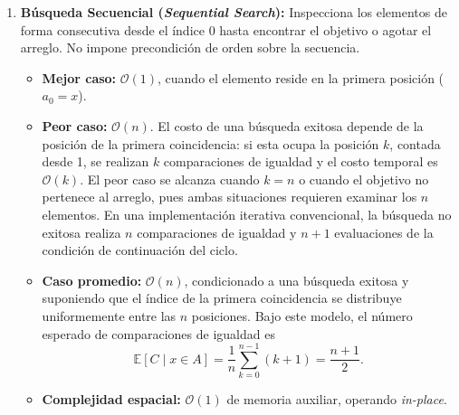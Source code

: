 \documentclass[11pt,letterpaper]{article}
\begin{document}
\begin{enumerate}
    \item \textbf{Búsqueda Secuencial (\textit{Sequential Search}):} 
    Inspecciona los elementos de forma consecutiva desde el índice $0$ hasta encontrar el objetivo o agotar el arreglo. No impone precondición de orden sobre la secuencia.
    \begin{itemize}
        \item \textbf{Mejor caso:} $\mathcal{O}(1)$, cuando el elemento reside en la primera posición ($a_0 = x$).
        \item \textbf{Peor caso:} $\mathcal{O}(n)$. El costo de una búsqueda exitosa
        depende de la posición de la primera coincidencia: si esta ocupa
        la posición $k$, contada desde 1, se realizan $k$ comparaciones
        de igualdad y el costo temporal es $\mathcal{O}(k)$. El peor caso se alcanza
        cuando $k=n$ o cuando el objetivo no pertenece al arreglo, pues
        ambas situaciones requieren examinar los $n$ elementos.
        En una implementación iterativa convencional, la búsqueda
        no exitosa realiza $n$ comparaciones de igualdad y $n+1$
        evaluaciones de la condición de continuación del ciclo.
         \item \textbf{Caso promedio:} $\mathcal{O}(n)$, condicionado a una búsqueda exitosa y suponiendo que el índice de la primera coincidencia se distribuye uniformemente entre las $n$ posiciones. Bajo este modelo, el número esperado de comparaciones de igualdad es
    \[
        \mathbb{E}[C \mid x \in A]
        = \frac{1}{n}\sum_{k=0}^{n-1}(k+1)
        = \frac{n+1}{2}.
    \]
        \item \textbf{Complejidad espacial:} $\mathcal{O}(1)$ de memoria auxiliar, operando \textit{in-place}.
    \end{itemize}


\end{enumerate}
\end{document}
